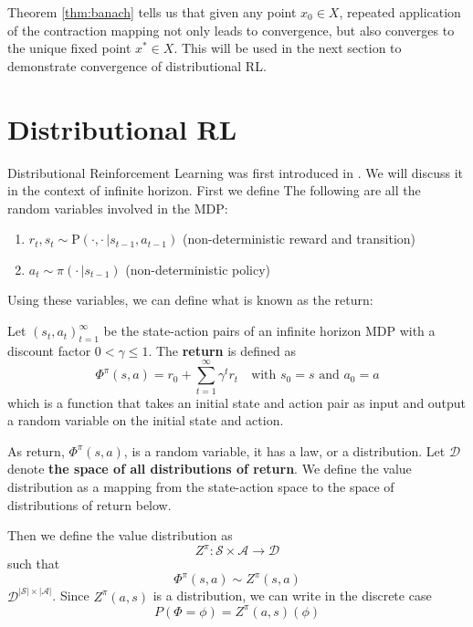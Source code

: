 \documentclass{article}
\begin{document}
Theorem \ref{thm:banach} tells us that given any point $x_0 \in X$, repeated application of the contraction mapping not only leads to convergence, but also converges to the unique fixed point $x^* \in X$. This will be used in the next section to demonstrate convergence of distributional RL.

\section{Distributional RL}
Distributional Reinforcement Learning was first introduced in \citet{distributional}. We will discuss it in the context of infinite horizon.
First we define The following are all the random variables involved in the MDP:
\begin{enumerate}
    \item $r_t, s_t \sim \text{P}(\cdot,\cdot \,|s_{t-1}, a_{t-1})$ (non-deterministic reward and transition)
    \item $a_t \sim \pi(\cdot \,|s_{t-1})$ (non-deterministic policy)
\end{enumerate}
Using these variables, we can define what is known as the return:
\begin{defn}[Return]
\label{def:Return}
Let $(s_t,a_t)_{t=1}^\infty$ be the state-action pairs of an infinite horizon MDP with a discount factor $0<\gamma\leq1$.
The \textbf{return} is defined as
\begin{equation}
    \Phi^\pi(s, a)=r_0+\sum_{t=1}^{\infty} \gamma^t r_t \,\,\, \, \, \, \text{with } s_0=s \text{ and } a_0 = a 
\end{equation}
which is a function that takes an initial state and action pair as input and output a random variable on the initial state and action. 
\end{defn}

As return, $\Phi^\pi(s,a)$, is a random variable, it has a law, or a distribution.  
Let $\mathcal{D}$ denote \textbf{the space of all distributions of return}.
We define the value distribution as a mapping from the state-action space to the space of distributions of return below.

\begin{defn} \label{def:valueDistribution}
Then we define the value distribution as
$$Z^\pi:\mathcal{S}\times \mathcal{A} \rightarrow \mathcal{D}$$
such that
\begin{equation*}
 \Phi^\pi(s, a) \sim Z^\pi(s, a)
\end{equation*}
 $\mathcal{D}^{|\mathcal{S}|\times|\mathcal{A}|}$. Since $Z^\pi(a, s)$ is a distribution, we can write in the discrete case
$$P(\Phi=\phi)=Z^\pi(a, s)(\phi)$$
\end{defn}
\end{document}
